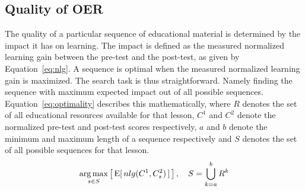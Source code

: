 \subsection{Quality of OER}
The quality of a particular sequence of educational material is determined by
the impact it has on learning. The impact is defined as the measured normalized
learning gain between the pre-test and the post-test, as given by
Equation~\eqref{eq:nlg}. A sequence is optimal when the measured normalized
learning gain is maximized. The search task is thus straightforward. Namely
finding the sequence with maximum expected impact out of all possible sequences.
Equation~\eqref{eq:optimality} describes this mathematically, where $R$
denotes the set of all educational resources available for that lesson, $C^1$
and $C^2$ denote the normalized pre-test and post-test scores respectively, $a$
and $b$ denote the minimum and maximum length of a sequence respectively and
$S$ denotes the set of all possible sequences for that lesson.
\begin{equation}
	\label{eq:optimality}
	\operatorname*{arg\,max}_{s \in S} \left[\,\operatorname{E}[\,nlg(C^1, C^2_s)\,]\,\right],
	\quad S = \bigcup_{k = a}^{b} R^k
\end{equation}
